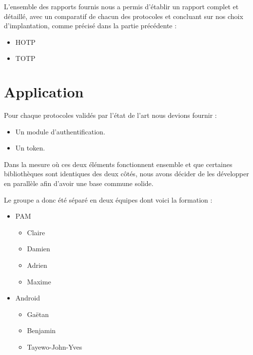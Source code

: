     L'ensemble des rapports fournis nous a permis d'établir un rapport complet
    et détaillé, avec un comparatif de chacun des protocoles et concluant sur
    nos choix d'implantation, comme précisé dans la partie précédente :

    \begin{itemize}
      \item HOTP
      \item TOTP
    \end{itemize}

\newpage
\section{Application}

      Pour chaque protocoles validés par l'état de l'art nous devions fournir :

      \begin{itemize}
        \item Un module d'authentification.
        \item Un token.
      \end{itemize}

      Dans la mesure où ces deux éléments fonctionnent ensemble et que
      certaines bibliothèques sont identiques des deux côtés, nous avons
      décider de les développer en parallèle afin d'avoir une base commune
      solide.

      Le groupe a donc été séparé en deux équipes dont voici la formation :

      \begin{itemize}
        \item PAM
        \begin{itemize}
          \item Claire 
          \item Damien 
          \item Adrien 
          \item Maxime 
        \end{itemize}
        \item Android
        \begin{itemize}
          \item Gaëtan 
          \item Benjamin 
          \item Tayewo-John-Yves 
        \end{itemize}
      \end{itemize}


